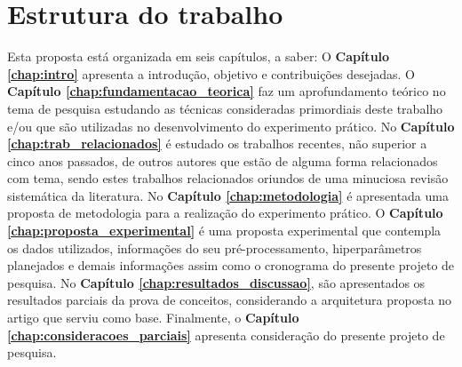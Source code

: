 \section{Estrutura do trabalho}
\label{sec:cap1_estrutura_trabalho}

Esta proposta está organizada em seis capítulos, a saber:
O \textbf{Capítulo \ref{chap:intro}} apresenta a introdução, objetivo e contribuições desejadas. O \textbf{Capítulo \ref{chap:fundamentacao_teorica}} faz um aprofundamento teórico no tema de pesquisa estudando as técnicas consideradas primordiais deste trabalho e/ou que são utilizadas no desenvolvimento do experimento prático. No \textbf{Capítulo \ref{chap:trab_relacionados}} é estudado  os trabalhos recentes, não superior a cinco anos passados, de outros autores que estão de alguma forma relacionados com tema, sendo estes trabalhos relacionados oriundos de uma minuciosa revisão sistemática da literatura. No \textbf{Capítulo \ref{chap:metodologia}} é apresentada uma proposta de metodologia para a realização do experimento prático. O \textbf{Capítulo \ref{chap:proposta_experimental}} é uma proposta experimental que contempla os dados utilizados, informações do seu pré-processamento, hiperparâmetros planejados e demais informações assim como o cronograma do presente projeto de pesquisa. No \textbf{Capítulo \ref{chap:resultados_discussao}}, são apresentados os resultados parciais da prova de conceitos, considerando a arquitetura proposta no artigo que serviu como base. Finalmente, o \textbf{Capítulo \ref{chap:consideracoes_parciais}} apresenta consideração do presente projeto de pesquisa.
